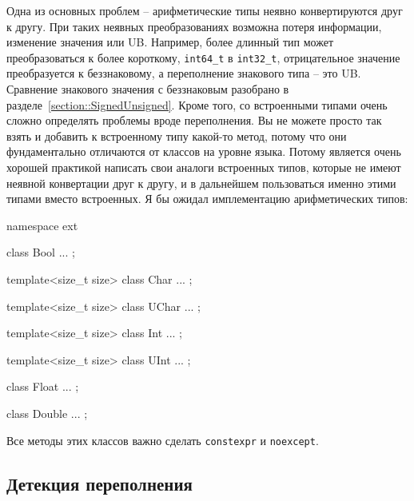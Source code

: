 Одна из основных проблем -- арифметические типы неявно конвертируются друг к другу.
При таких неявных преобразованиях возможна потеря информации, изменение значения или UB.
Например, более длинный тип может преобразоваться к более короткому, \verb"int64_t" в \verb"int32_t", отрицательное значение преобразуется к беззнаковому, а переполнение знакового типа -- это UB.
Сравнение знакового значения с беззнаковым разобрано в разделе~\ref{section::SignedUnsigned}.
Кроме того, со встроенными типами очень сложно определять проблемы вроде переполнения.
Вы не можете просто так взять и добавить к встроенному типу какой-то метод, потому что они фундаментально отличаются от классов на уровне языка.
Потому является очень хорошей практикой написать свои аналоги встроенных типов, которые не имеют неявной конвертации друг к другу, и в дальнейшем пользоваться именно этими типами вместо встроенных.
Я бы ожидал имплементацию арифметических типов:
\begin{cppcode}
namespace ext {
class Bool { ... };

template<size_t size>
class Char { ... };

template<size_t size>
class UChar { ... };

template<size_t size>
class Int { ... };

template<size_t size>
class UInt { ... };

class Float { ... };

class Double { ... };
}
\end{cppcode}
Все методы этих классов важно сделать \verb"constexpr" и \verb"noexcept".

\subsection{Детекция переполнения}

